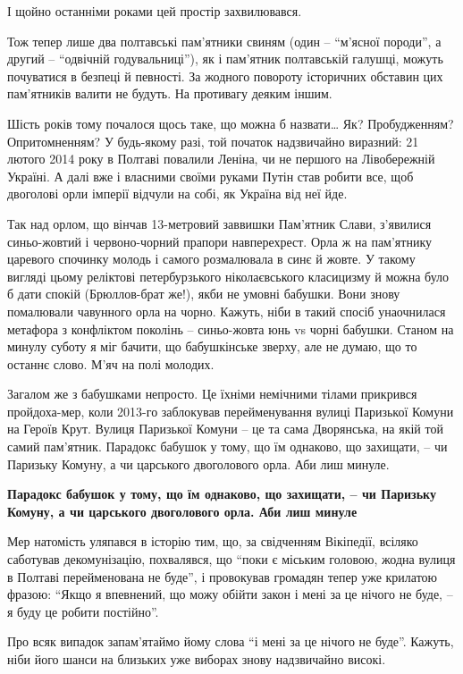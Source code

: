 І щойно останніми роками цей простір захвилювався.

Тож тепер лише два полтавські пам'ятники свиням (один – \enquote{м'ясної породи}, а
другий – \enquote{одвічній годувальниці}), як і пам'ятник полтавській галушці, можуть
почуватися в безпеці й певності. За жодного повороту історичних обставин цих
пам'ятників валити не будуть. На противагу деяким іншим.

Шість років тому почалося щось таке, що можна б назвати… Як? Пробудженням?
Опритомненням? У будь-якому разі, той початок надзвичайно виразний: 21 лютого
2014 року в Полтаві повалили Леніна, чи не першого на Лівобережній Україні. А
далі вже і власними своїми руками Путін став робити все, щоб двоголові орли
імперії відчули на собі, як Україна від неї йде.

Так над орлом, що вінчав 13-метровий заввишки Пам'ятник Слави, з'явилися
синьо-жовтий і червоно-чорний прапори навперехрест. Орла ж на пам'ятнику
царевого спочинку молодь і самого розмалювала в синє й жовте. У такому вигляді
цьому реліктові петербурзького ніколаєвського класицизму й можна було б дати
спокій (Брюллов-брат же!), якби не умовні бабушки. Вони знову помалювали
чавунного орла на чорно. Кажуть, ніби в такий спосіб унаочнилася метафора з
конфліктом поколінь – синьо-жовта юнь vs чорні бабушки. Станом на минулу суботу
я міг бачити, що бабушкінське зверху, але не думаю, що то останнє слово. М'яч
на полі молодих.

Загалом же з бабушками непросто. Це їхніми немічними тілами прикрився
пройдоха-мер, коли 2013-го заблокував перейменування вулиці Паризької Комуни на
Героїв Крут. Вулиця Паризької Комуни – це та сама Дворянська, на якій той самий
пам'ятник. Парадокс бабушок у тому, що їм однаково, що захищати, – чи Паризьку
Комуну, а чи царського двоголового орла. Аби лиш минуле.

\begin{leftbar}
	\bfseries
Парадокс бабушок у тому, що їм однаково, що захищати, – чи Паризьку Комуну, а
чи царського двоголового орла. Аби лиш минуле
\end{leftbar}

Мер натомість уляпався в історію тим, що, за свідченням Вікіпедії, всіляко
саботував декомунізацію, похвалявся, що \enquote{поки є міським головою, жодна вулиця в
Полтаві перейменована не буде}, і провокував громадян тепер уже крилатою
фразою: \enquote{Якщо я впевнений, що можу обійти закон і мені за це нічого не буде, –
я буду це робити постійно}.

Про всяк випадок запам'ятаймо йому слова \enquote{і мені за це нічого не буде}. Кажуть,
ніби його шанси на близьких уже виборах знову надзвичайно високі.

